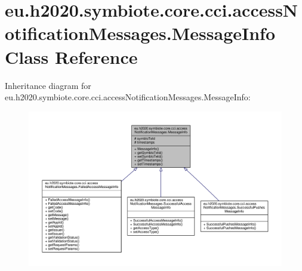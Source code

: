 \hypertarget{classeu_1_1h2020_1_1symbiote_1_1core_1_1cci_1_1accessNotificationMessages_1_1MessageInfo}{}\section{eu.\+h2020.\+symbiote.\+core.\+cci.\+access\+Notification\+Messages.\+Message\+Info Class Reference}
\label{classeu_1_1h2020_1_1symbiote_1_1core_1_1cci_1_1accessNotificationMessages_1_1MessageInfo}


Inheritance diagram for eu.\+h2020.\+symbiote.\+core.\+cci.\+access\+Notification\+Messages.\+Message\+Info\+:\nopagebreak
\begin{figure}[H]
\begin{center}
\leavevmode
\includegraphics[width=350pt]{classeu_1_1h2020_1_1symbiote_1_1core_1_1cci_1_1accessNotificationMessages_1_1MessageInfo__inherit__graph}
\end{center}
\end{figure}


